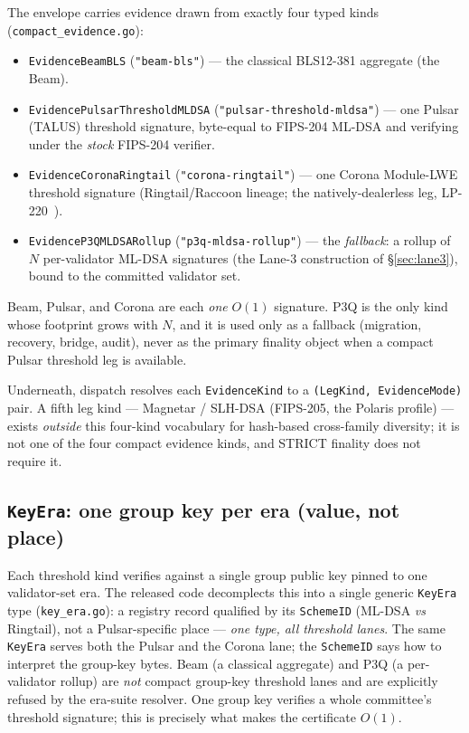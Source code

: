 The envelope carries evidence drawn from exactly four typed kinds
(\texttt{compact\_evidence.go}):
\begin{itemize}[leftmargin=2em,nosep]
  \item \texttt{EvidenceBeamBLS} (\texttt{"beam-bls"}) --- the classical
        BLS12-381 aggregate (the Beam).
  \item \texttt{EvidencePulsarThresholdMLDSA}
        (\texttt{"pulsar-threshold-mldsa"}) --- one Pulsar (TALUS) threshold
        signature, byte-equal to FIPS-204 ML-DSA and verifying under the
        \emph{stock} FIPS-204 verifier.
  \item \texttt{EvidenceCoronaRingtail} (\texttt{"corona-ringtail"}) --- one
        Corona Module-LWE threshold signature (Ringtail/Raccoon lineage; the
        natively-dealerless leg, LP-220~\cite{corona}).
  \item \texttt{EvidenceP3QMLDSARollup} (\texttt{"p3q-mldsa-rollup"}) ---
        the \emph{fallback}: a rollup of $N$ per-validator ML-DSA signatures
        (the Lane-3 construction of \S\ref{sec:lane3}), bound to the
        committed validator set.
\end{itemize}
Beam, Pulsar, and Corona are each \emph{one} $O(1)$ signature. P3Q is the
only kind whose footprint grows with $N$, and it is used only as a fallback
(migration, recovery, bridge, audit), never as the primary finality object
when a compact Pulsar threshold leg is available.

\begin{remark}
Underneath, dispatch resolves each \texttt{EvidenceKind} to a
\texttt{(LegKind, EvidenceMode)} pair. A fifth leg kind --- Magnetar /
SLH-DSA (FIPS-205, the Polaris profile) --- exists \emph{outside} this
four-kind vocabulary for hash-based cross-family diversity; it is not one of
the four compact evidence kinds, and STRICT finality does not require it.
\end{remark}

\subsection{\texttt{KeyEra}: one group key per era (value, not place)}
\label{sec:compact-cert:keyera}

Each threshold kind verifies against a single group public key pinned to one
validator-set era. The released code decomplects this into a single generic
\texttt{KeyEra} type (\texttt{key\_era.go}): a registry record qualified by
its \texttt{SchemeID} (ML-DSA \emph{vs} Ringtail), not a Pulsar-specific
place --- \emph{one type, all threshold lanes}. The same \texttt{KeyEra}
serves both the Pulsar and the Corona lane; the \texttt{SchemeID} says how to
interpret the group-key bytes. Beam (a classical aggregate) and P3Q (a
per-validator rollup) are \emph{not} compact group-key threshold lanes and
are explicitly refused by the era-suite resolver. One group key verifies a
whole committee's threshold signature; this is precisely what makes the
certificate $O(1)$.

